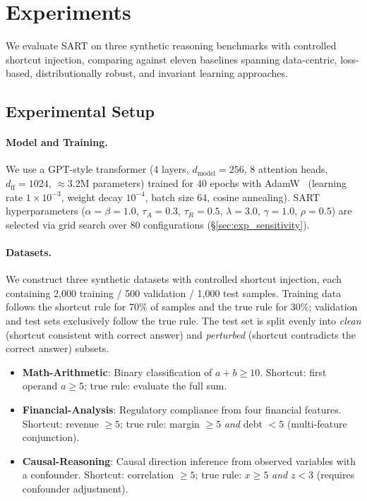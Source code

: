 \section{Experiments}
\label{sec:experiments}

We evaluate SART on three synthetic reasoning benchmarks with controlled shortcut injection, comparing against eleven baselines spanning data-centric, loss-based, distributionally robust, and invariant learning approaches.

\subsection{Experimental Setup}
\label{sec:exp_setup}

\paragraph{Model and Training.}
We use a GPT-style transformer (4 layers, $d_{\mathrm{model}}=256$, 8 attention heads, $d_{\mathrm{ff}}=1024$, ${\approx}$3.2M parameters) trained for 40 epochs with AdamW~\cite{loshchilov2019decoupled} (learning rate $1{\times}10^{-3}$, weight decay $10^{-4}$, batch size 64, cosine annealing). SART hyperparameters ($\alpha{=}\beta{=}1.0$, $\tau_A{=}0.3$, $\tau_R{=}0.5$, $\lambda{=}3.0$, $\gamma{=}1.0$, $\rho{=}0.5$) are selected via grid search over 80 configurations (\S\ref{sec:exp_sensitivity}).

\paragraph{Datasets.}
We construct three synthetic datasets with controlled shortcut injection, each containing 2{,}000 training / 500 validation / 1{,}000 test samples. Training data follows the shortcut rule for 70\% of samples and the true rule for 30\%; validation and test sets exclusively follow the true rule. The test set is split evenly into \emph{clean} (shortcut consistent with correct answer) and \emph{perturbed} (shortcut contradicts the correct answer) subsets.
\begin{itemize}[leftmargin=*, itemsep=1pt]
    \item \textbf{Math-Arithmetic}: Binary classification of $a+b \geq 10$. Shortcut: first operand $a \geq 5$; true rule: evaluate the full sum.
    \item \textbf{Financial-Analysis}: Regulatory compliance from four financial features. Shortcut: revenue $\geq 5$; true rule: margin $\geq 5$ \emph{and} debt $< 5$ (multi-feature conjunction).
    \item \textbf{Causal-Reasoning}: Causal direction inference from observed variables with a confounder. Shortcut: correlation $\geq 5$; true rule: $x \geq 5$ \emph{and} $z < 3$ (requires confounder adjustment).
\end{itemize}

